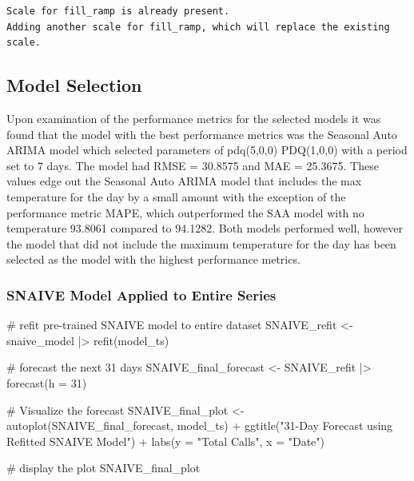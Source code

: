\documentclass[
  letterpaper,
  DIV=11,
  numbers=noendperiod]{scrartcl}
\newenvironment{Shaded}{\begin{snugshade}}{\end{snugshade}}
\newcommand{\AttributeTok}[1]{\textcolor[rgb]{0.40,0.45,0.13}{#1}}
\newcommand{\CommentTok}[1]{\textcolor[rgb]{0.37,0.37,0.37}{#1}}
\newcommand{\DecValTok}[1]{\textcolor[rgb]{0.68,0.00,0.00}{#1}}
\newcommand{\FunctionTok}[1]{\textcolor[rgb]{0.28,0.35,0.67}{#1}}
\newcommand{\NormalTok}[1]{\textcolor[rgb]{0.00,0.23,0.31}{#1}}
\newcommand{\OtherTok}[1]{\textcolor[rgb]{0.00,0.23,0.31}{#1}}
\newcommand{\SpecialCharTok}[1]{\textcolor[rgb]{0.37,0.37,0.37}{#1}}
\newcommand{\StringTok}[1]{\textcolor[rgb]{0.13,0.47,0.30}{#1}}
\begin{document}
\begin{verbatim}
Scale for fill_ramp is already present.
Adding another scale for fill_ramp, which will replace the existing scale.
\end{verbatim}

\subsection{Model Selection}\label{model-selection}

Upon examination of the performance metrics for the selected models it
was found that the model with the best performance metrics was the
Seasonal Auto ARIMA model which selected parameters of pdq(5,0,0)
PDQ(1,0,0) with a period set to 7 days. The model had RMSE = 30.8575 and
MAE = 25.3675. These values edge out the Seasonal Auto ARIMA model that
includes the max temperature for the day by a small amount with the
exception of the performance metric MAPE, which outperformed the SAA
model with no temperature 93.8061 compared to 94.1282. Both models
performed well, however the model that did not include the maximum
temperature for the day has been selected as the model with the highest
performance metrics.

\subsubsection{SNAIVE Model Applied to Entire
Series}\label{snaive-model-applied-to-entire-series}

\begin{Shaded}
\begin{Highlighting}[]
\CommentTok{\# refit pre{-}trained SNAIVE model to entire dataset}
\NormalTok{SNAIVE\_refit }\OtherTok{\textless{}{-}}\NormalTok{ snaive\_model }\SpecialCharTok{|\textgreater{}}
  \FunctionTok{refit}\NormalTok{(model\_ts)}

\CommentTok{\# forecast the next 31 days}
\NormalTok{SNAIVE\_final\_forecast }\OtherTok{\textless{}{-}}\NormalTok{ SNAIVE\_refit }\SpecialCharTok{|\textgreater{}}
  \FunctionTok{forecast}\NormalTok{(}\AttributeTok{h =} \DecValTok{31}\NormalTok{)}

\CommentTok{\# Visualize the forecast}
\NormalTok{SNAIVE\_final\_plot }\OtherTok{\textless{}{-}} \FunctionTok{autoplot}\NormalTok{(SNAIVE\_final\_forecast, model\_ts) }\SpecialCharTok{+}
  \FunctionTok{ggtitle}\NormalTok{(}\StringTok{"31{-}Day Forecast using Refitted SNAIVE Model"}\NormalTok{) }\SpecialCharTok{+}
  \FunctionTok{labs}\NormalTok{(}\AttributeTok{y =} \StringTok{"Total Calls"}\NormalTok{, }\AttributeTok{x =} \StringTok{"Date"}\NormalTok{)}

\CommentTok{\# display the plot}
\NormalTok{SNAIVE\_final\_plot}
\end{Highlighting}
\end{Shaded}
\end{document}
